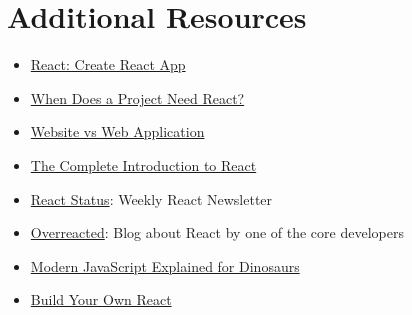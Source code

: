 \section{Additional Resources}

\begin{itemize}[leftmargin=*]
    \item \href{https://reactjs.org/docs/add-react-to-a-new-app.html#create-react-app}{React: Create React App}
    \item \href{https://css-tricks.com/project-need-react/}{When Does a Project Need React?}
    \item \href{https://www.seguetech.com/website-vs-web-application-whats-the-difference/}{Website vs Web Application}
    \item \href{https://jscomplete.com/learn/complete-intro-react}{The Complete Introduction to React}
    \item \href{http://react.statuscode.com/}{React Status}: Weekly React Newsletter
    \item \href{https://overreacted.io}{Overreacted}: Blog about React by one of the core developers
    \item \href{https://medium.com/the-node-js-collection/modern-javascript-explained-for-dinosaurs-f695e9747b70}{Modern JavaScript Explained for Dinosaurs}
    \item \href{https://pomb.us/build-your-own-react/}{Build Your Own React}
\end{itemize}
